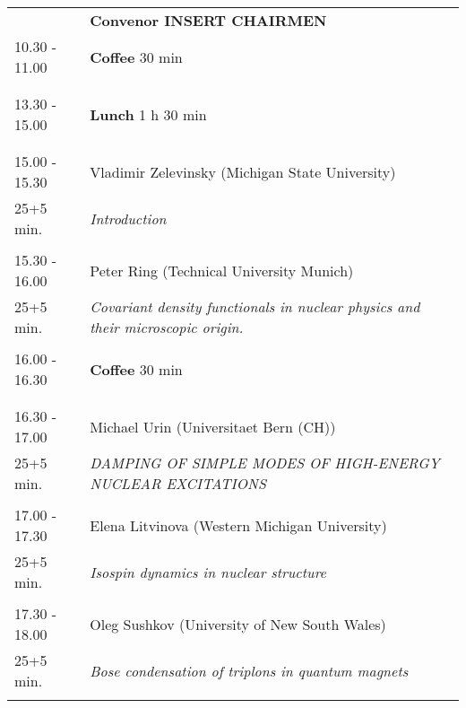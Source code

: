 \begin{longtable}{p{3cm}p{13cm}}
&\hfill {\bf Convenor INSERT CHAIRMEN }\\ 
10.30 - 11.00 & {\bf Coffee} \hfill 30 min \\ 
 & \\ 
 & \\ 
13.30 - 15.00 & {\bf Lunch} \hfill 1 h 30 min \\ 
 & \\ 
 & \\ 
15.00 - 15.30 & Vladimir Zelevinsky (Michigan State University)\\ 
25+5 min. & {\it Introduction}\\ 
 & \\ 
15.30 - 16.00 & Peter Ring (Technical University Munich)\\ 
25+5 min. & {\it Covariant density functionals in nuclear physics and their microscopic origin.}\\ 
 & \\ 
16.00 - 16.30 & {\bf Coffee} \hfill 30 min \\ 
 & \\ 
 & \\ 
16.30 - 17.00 & Michael Urin (Universitaet Bern (CH))\\ 
25+5 min. & {\it DAMPING OF SIMPLE MODES OF HIGH-ENERGY NUCLEAR EXCITATIONS}\\ 
 & \\ 
17.00 - 17.30 & Elena Litvinova (Western Michigan University)\\ 
25+5 min. & {\it Isospin dynamics in nuclear structure}\\ 
 & \\ 
17.30 - 18.00 & Oleg Sushkov (University of New South Wales)\\ 
25+5 min. & {\it Bose condensation of triplons in quantum magnets}\\ 
 & \\ 
\end{longtable}

